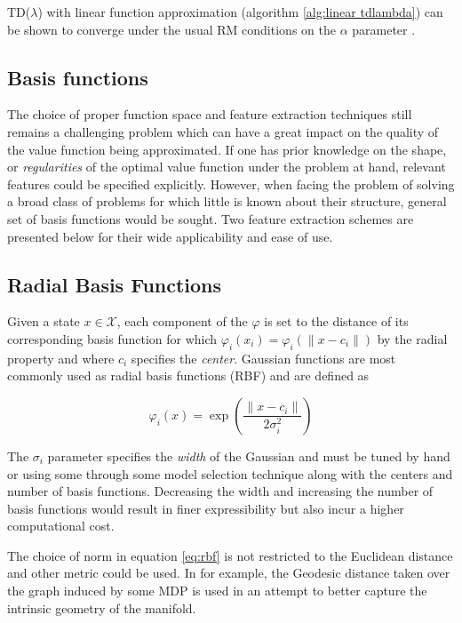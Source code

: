 \documentclass[12pt, oneside, extrafontsizes]{memoir}  %
\theoremstyle{plain}
\theoremstyle{definition}
\begin{document}
TD($\lambda$) with linear function approximation (algorithm \ref{alg:linear
tdlambda}) can be shown to converge under the usual RM conditions on the $\alpha$
parameter \cite{Tsitsiklis1997}.

\subsection{Basis functions}

The choice of proper function space and feature extraction techniques still remains a
challenging problem which can have a great impact on the quality of the value function
being approximated. If one has prior knowledge on the shape, or \textit{regularities}
of the optimal value function under the problem at hand, relevant features could be
specified explicitly. However, when facing the problem of solving a broad class of
problems for which little is known about their structure, general set of basis functions
would be sought. Two feature extraction schemes are presented below for their wide
applicability and ease of use. 

\subsection{Radial Basis Functions}

Given a state $x \in \mathcal{X}$, each component of the $\varphi$ is set to the
distance of its corresponding basis function for which $\varphi_i(x_i) = \varphi_i(\|x -
c_i\|)$ by the radial property and where $c_i$ specifies the \textit{center}. Gaussian
functions are most commonly used as radial basis functions (RBF) and are defined as

\begin{equation}
\varphi_i(x) = \exp\left( \frac{\| x - c_i\|}{2\sigma_i^2}\right)
\label{eq:rbf}
\end{equation}

The $\sigma_i$ parameter specifies the \textit{width} of the Gaussian and must be
tuned by hand or using some through some model selection technique along with the
centers and number of basis functions. Decreasing the width and increasing the
number of basis functions would result in finer expressibility but also incur a higher
computational cost. 

The choice of norm in equation \ref{eq:rbf} is not restricted to the Euclidean distance
and other metric could be used. In \cite{Sugiyama2008} for example, the Geodesic
distance taken over the graph induced by some MDP is used in an attempt to better
capture the intrinsic geometry of the manifold.
 
\end{document}

